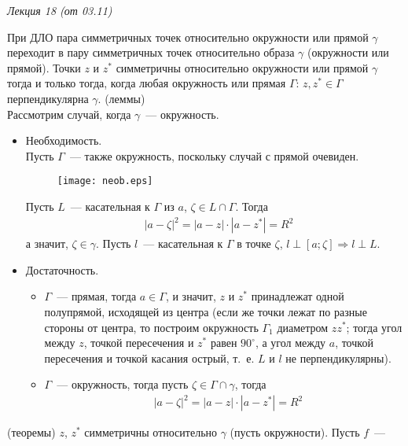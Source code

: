 \begin{flushright}
    \textit{Лекция 18 (от 03.11)}
\end{flushright}
\theorem
При ДЛО пара симметричных точек относительно окружности или прямой $\gamma$
переходит в пару симметричных точек относительно образа $\gamma$ (окружности или
прямой).
\lemma
Точки $z$ и $z^*$ симметричны относительно окружности или прямой $\gamma$ тогда
и только тогда, когда любая окружность или прямая $\Gamma$: $z, z^* \in \Gamma$
перпендикулярна $\gamma$.
\pr (леммы)
\\
Рассмотрим случай, когда $\gamma$~--- окружность. 
\begin{itemize}
    \item Необходимость.
    \\
    Пусть $\Gamma$~--- также окружность, поскольку случай с прямой очевиден.
    \begin{figure}[h!]
        \centering
        \texttt{[image: neob.eps]}
        \label{fig:23.1}
    \end{figure}
    Пусть $L$~--- касательная к $\Gamma$ из $a$, $\zeta \in L \cap \Gamma$.
    Тогда
    \begin{align*}
      & \left| a - \zeta \right|^2 = \left| a-z \right|\cdot \left| a-z^* \right| = R^2
    \end{align*}
    а значит, $\zeta \in \gamma$. Пусть $l$~--- касательная к $\Gamma$ в точке
    $\zeta$, $l \perp [a;\zeta] \Rightarrow l \perp L$.
    \item Достаточность.
    \begin{itemize}
        \item $\Gamma$~--- прямая, тогда $a \in \Gamma$, и значит, $z$ и $z^*$
        принадлежат одной полупрямой, исходящей из центра (если же точки лежат
        по разные стороны от центра, то построим окружность $\Gamma_1$ диаметром
        $zz^*$; тогда угол между $z$, точкой пересечения и $z^*$ равен
        $90^{\circ}$, а угол между $a$, точкой пересечения и точкой касания
        острый, т.~е. $L$ и $l$ не перпендикулярны).
        \item $\Gamma$~--- окружность, тогда пусть $\zeta \in \Gamma \cap
        \gamma$, тогда
        \begin{align*}
          & \left| a - \zeta \right|^2 = \left| a-z \right|\cdot \left| a-z^* \right| = R^2
        \end{align*}
    \end{itemize}
\end{itemize}
\pr (теоремы)
$z$, $z^*$ симметричны относительно $\gamma$ (пусть окружности). Пусть $f$~---
